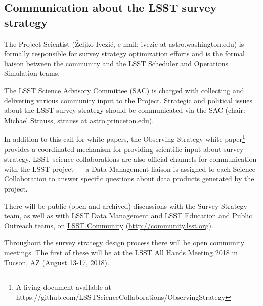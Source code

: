 \documentclass[DM,lsstdraft,toc,usenatbib]{lsstdoc}
\begin{document}
\subsection{Communication about the LSST survey strategy} 

The Project Scientist (\v{Z}eljko Ivezi\'{c}, e-mail: ivezic at astro.washington.edu) is formally responsible for survey strategy optimization efforts and is the formal liaison between the community and the LSST Scheduler and Operations Simulation teams.

The LSST Science Advisory Committee (SAC) is charged with collecting and delivering various community input to the Project. Strategic and political issues about the LSST survey strategy should be communicated via the SAC (chair: Michael Strauss, strauss at astro.princeton.edu).

In addition to this call for white papers, the Observing Strategy white paper\footnote{A living document available at https://github.com/LSSTScienceCollaborations/ObservingStrategy} provides a coordinated mechanism for providing scientific input about survey strategy. LSST science collaborations are also official channels for communication with the LSST project --- a Data Management liaison is assigned to each Science Collaboration to answer specific questions about data products generated by the project.

There will be public (open and archived) discussions with the Survey Strategy team, as well as with LSST Data Management 
and LSST Education and Public Outreach teams, on \href{http://community.lsst.org}{LSST Community} (\url{http://community.lsst.org}). 

Throughout the survey strategy design process there will be open community meetings. The first of these will be 
at the LSST All Hands Meeting 2018 in Tucson, AZ (August 13-17, 2018). 
\end{document}
